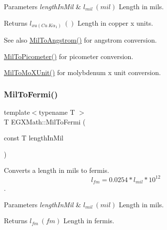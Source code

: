 \begin{DoxyParams}{Parameters}
{\em length\+In\+Mil} & $ l_{mil}\ (mil)$ Length in mils. \\
\hline
\end{DoxyParams}
\begin{DoxyReturn}{Returns}
$ l_{xu(Cu\ K\alpha_1)}\ ()$ Length in copper x units. 
\end{DoxyReturn}
\begin{DoxySeeAlso}{See also}
\mbox{\hyperlink{group___e_g_x_math-_conversions-_length_conversions-_imperial-_mil-_non-_s_i_gad209d1b047ce810b8879b9ea1ff4a5a5}{Mil\+To\+Angstrom()}} for angstrom conversion. 

\mbox{\hyperlink{group___e_g_x_math-_conversions-_length_conversions-_imperial-_mil-_s_i_ga29a85f8ec2e5cf4d963468f882de8447}{Mil\+To\+Picometer()}} for picometer conversion. 

\mbox{\hyperlink{group___e_g_x_math-_conversions-_length_conversions-_imperial-_mil-_non-_s_i_ga673efde012cc982641b2eb1266f88f3a}{Mil\+To\+Mo\+X\+Unit()}} for molybdenum x unit conversion. 
\end{DoxySeeAlso}
\mbox{\label{group___e_g_x_math-_conversions-_length_conversions-_imperial-_mil-_non-_s_i_ga713363db9840eea0ed836b1d47cc0b6c}} 
\subsubsection{\texorpdfstring{Mil\+To\+Fermi()}{MilToFermi()}}
{\footnotesize\ttfamily template$<$typename T $>$ \\
T E\+G\+X\+Math\+::\+Mil\+To\+Fermi (\begin{DoxyParamCaption}\item[{const T}]{length\+In\+Mil }\end{DoxyParamCaption})}



Converts a length in mils to fermis. \[ l_{fm}=0.0254 * l_{mil} * 10^{12} \]. 


\begin{DoxyParams}{Parameters}
{\em length\+In\+Mil} & $ l_{mil}\ (mil)$ Length in mils. \\
\hline
\end{DoxyParams}
\begin{DoxyReturn}{Returns}
$ l_{fm}\ (fm)$ Length in fermis. 
\end{DoxyReturn}
\mbox{\label{group___e_g_x_math-_conversions-_length_conversions-_imperial-_mil-_non-_s_i_gab38b772b1b070729756dcdc87826f5d0}} 
